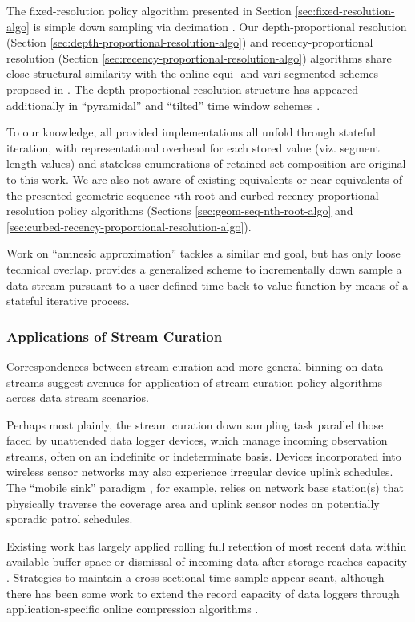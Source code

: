 The fixed-resolution policy algorithm presented in Section \ref{sec:fixed-resolution-algo} is simple down sampling via decimation \citep[p. 31]{crochiere1983multirate}.
Our depth-proportional resolution (Section \ref{sec:depth-proportional-resolution-algo}) and recency-proportional resolution (Section \ref{sec:recency-proportional-resolution-algo}) algorithms share close structural similarity with the online equi- and vari-segmented schemes proposed in
\citep{zhao2005generalized}.
The depth-proportional resolution structure has appeared additionally in ``pyramidal'' and ``tilted'' time window schemes \citep{aggarwal2003framework,han2005stream}.

To our knowledge, all provided implementations all unfold through stateful iteration, with representational overhead for each stored value (viz. segment length values) and stateless enumerations of retained set composition are original to this work.
We are also not aware of existing equivalents or near-equivalents of the presented geometric sequence $n$th root and curbed recency-proportional resolution policy algorithms (Sections \ref{sec:geom-seq-nth-root-algo} and \ref{sec:curbed-recency-proportional-resolution-algo}).

Work on ``amnesic approximation'' tackles a similar end goal, but has only loose technical overlap.
\cite{palpanas2004online} provides a generalized scheme to incrementally down sample a data stream pursuant to a user-defined time-back-to-value function by means of a stateful iterative process.

\subsubsection{Applications of Stream Curation}

Correspondences between stream curation and more general binning on data streams suggest avenues for application of stream curation policy algorithms across data stream scenarios.

Perhaps most plainly, the stream curation down sampling task parallel those faced by unattended data logger devices, which manage incoming observation streams, often on an indefinite or indeterminate basis.
Devices incorporated into wireless sensor networks may also experience irregular device uplink schedules.
The ``mobile sink'' paradigm \citep{jain2022survey}, for example, relies on network base station(s) that physically traverse the coverage area and uplink sensor nodes on potentially sporadic patrol schedules.

Existing work has largely applied rolling full retention of most recent data within available buffer space \citep{fincham1995use} or dismissal of incoming data after storage reaches capacity \citep{saunders1989portable,mahzan2017design}.
Strategies to maintain a cross-sectional time sample appear scant, although there has been some work to extend the record capacity of data loggers through application-specific online compression algorithms \citep{hadiatna2016design}.
